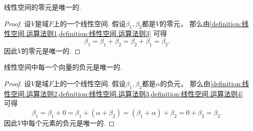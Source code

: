 \begin{property}%
线性空间的零元是唯一的.
\begin{proof}
设\(V\)是域\(F\)上的一个线性空间.
假设\(\beta_1,\beta_2\)都是\(V\)的零元，
那么由\cref{definition:线性空间.运算法则1,definition:线性空间.运算法则3}
可得\begin{equation*}
	\beta_1
	= \beta_1 + \beta_2
	= \beta_2 + \beta_1
	= \beta_2.
\end{equation*}
因此\(V\)的零元是唯一的.
\end{proof}
\end{property}

\begin{property}\label{theorem:线性空间.线性空间的结构.线性空间的性质2}
线性空间中每一个向量的负元是唯一的.
\begin{proof}
设\(V\)是域\(F\)上的一个线性空间.
假设\(\beta_1,\beta_2\)都是\(\alpha\)的负元，
那么由\cref{definition:线性空间.运算法则2,definition:线性空间.运算法则3,definition:线性空间.运算法则4}
可得\begin{equation*}
	\beta_1
	= \beta_1 + 0
	= \beta_1 + (\alpha + \beta_2)
	= (\beta_1 + \alpha) + \beta_2
	= 0 + \beta_2
	= \beta_2.
\end{equation*}
因此\(V\)中每个元素的负元是唯一的.
\end{proof}
\end{property}

